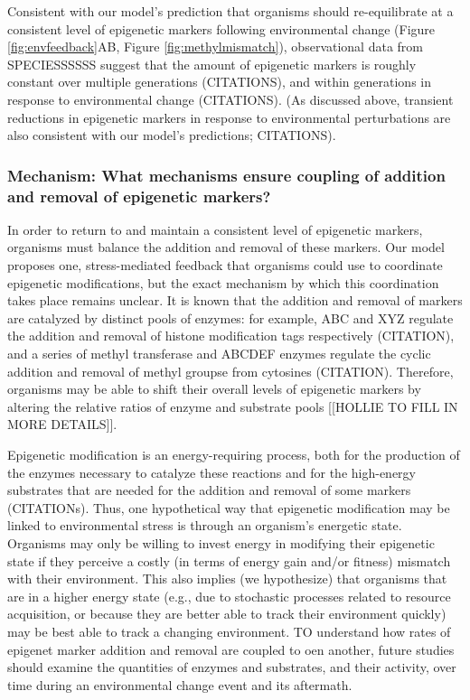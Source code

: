 \documentclass{article}
\begin{document}
Consistent with our model's prediction that organisms should re-equilibrate at a consistent level of epigenetic markers following environmental change (Figure \ref{fig:envfeedback}AB, Figure \ref{fig:methylmismatch}), observational data from SPECIESSSSSS suggest that the amount of epigenetic markers is roughly constant over multiple generations (CITATIONS), and within generations in response to environmental change (CITATIONS). (As discussed above, transient reductions in epigenetic markers in response to environmental perturbations are also consistent with our model's predictions; CITATIONS).



\subsubsection{Mechanism: What mechanisms ensure coupling of addition and removal of epigenetic markers?}

In order to return to and maintain a consistent level of epigenetic markers, organisms must balance the addition and removal of these markers. Our model proposes one, stress-mediated feedback that organisms could use to coordinate epigenetic modifications, but the exact mechanism by which this coordination takes place remains unclear. It is known that the addition and removal of markers are catalyzed by distinct pools of enzymes: for example, ABC and XYZ regulate the addition and removal of histone modification tags respectively (CITATION), and a series of methyl transferase and ABCDEF enzymes regulate the cyclic addition and removal of methyl groupse from cytosines (CITATION). Therefore, organisms may be able to shift their overall levels of epigenetic markers by altering the relative ratios of enzyme and substrate pools [[HOLLIE TO FILL IN MORE DETAILS]].

Epigenetic modification is an energy-requiring process, both for the production of the enzymes necessary to catalyze these reactions and for the high-energy substrates that are needed for the addition and removal of some markers (CITATIONs). Thus, one hypothetical way that epigenetic modification may be linked to environmental stress is through an organism's energetic state. Organisms may only be willing to invest energy in modifying their epigenetic state if they perceive a costly (in terms of energy gain and/or fitness) mismatch with their environment. This also implies (we hypothesize) that organisms that are in a higher energy state (e.g., due to stochastic processes related to resource acquisition, or because they are better able to track their environment quickly) may be best able to track a changing environment. TO understand how rates of epigenet marker addition and removal are coupled to oen another, future studies should examine the quantities of enzymes and substrates, and their activity, over time during an environmental change event and its aftermath.
\end{document}
